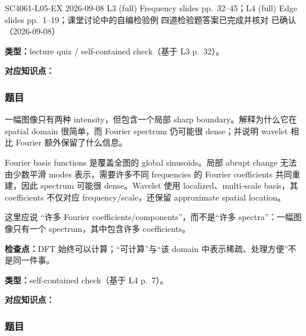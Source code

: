 
\clearpage


\examplemeta
  {SC4061-L05-EX}
  {2026-09-08}
  {L3 (full) Frequency slides pp.~32--45；L4 (full) Edge slides pp.~1--19；课堂讨论中的自编检验例}
  {四道检验题答案已完成并核对}
  {已确认（2026-09-08）}


\textbf{类型：}lecture quiz / self-contained check（基于 L3 p.~32）。

\textbf{对应知识点：}

\subsubsection*{题目}

一幅图像只有两种 intensity，但包含一个局部 sharp boundary。解释为什么它在 spatial domain 很简单，而 Fourier spectrum 仍可能很 dense；并说明 wavelet 相比 Fourier 额外保留了什么信息。

\begin{checkedsolution}
Fourier basis functions 是覆盖全图的 global sinusoids。局部 abrupt change 无法由少数平滑 modes 表示，需要许多不同 frequencies 的 Fourier coefficients 共同重建，因此 spectrum 可能很 dense。Wavelet 使用 localized、multi-scale basis，其 coefficients 不仅对应 frequency/scale，还保留 approximate spatial location。

这里应说 ``许多 Fourier coefficients/components''，而不是``许多 spectra''：一幅图像只有一个 spectrum，其中包含许多 coefficients。
\end{checkedsolution}

\textbf{检查点：}DFT 始终可以计算；``可计算''与``该 domain 中表示稀疏、处理方便''不是同一件事。


\textbf{类型：}self-contained check（基于 L4 p.~7）。

\textbf{对应知识点：}

\subsubsection*{题目}

